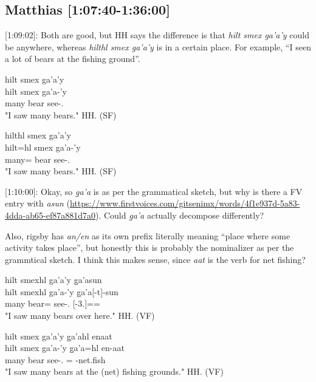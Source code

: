 \subsection{Matthias [1:07:40-1:36:00]}

[1:09:02]: Both are good, but HH says the difference is that \textit{hilt smex ga'a'y} could be anywhere, whereas \textit{hilthl smex ga'a'y} is in a certain place. For example, ``I seen a lot of bears at the fishing ground''.



\begin{exe}
    \ex
    \begin{xlist}
        \item \glll
        hilt smex ga'a'y \\
        hilt smex ga'a-'y \\
        many bear see-\Fsg{}.\Ii{} \\
        \glt "I saw many bears." \hfill HH.\ElicitationDate{} (SF)
        \item \glll
        hilthl smex ga'a'y \\
        hilt=hl smex ga'a-'y \\
        many=\Cn{} bear see-\Fsg{}.\Ii{} \\
        \glt "I saw many bears." \hfill HH.\ElicitationDate{} (SF)
    \end{xlist}
\end{exe}

[1:10:00]: Okay, so \textit{g̱a'a} is \Loc{} as per the grammatical sketch, but why is there a FV entry with \textit{asun} (\url{https://www.firstvoices.com/gitsenimx/words/4f1e937d-5a83-4dda-ab65-ef87a881d7a0}). Could \textit{g̱a'a} actually decompose differently?

Also, rigsby has \textit{an/en} as its own prefix literally meaning ``place where some activity takes place'', but honestly this is probably the nominalizer as per the grammtical sketch. I think this makes sense, since \textit{aat} is the verb for net fishing?

\begin{exe}
    \ex
    \begin{xlist}
        \item \glll
        hilt smexhl ga'a'y g̱a'asun \\
        hilt smexhl ga'a-'y g̱a'a[-t]-sun\\
        many bear=\Cn{} see-\Fsg{}.\Ii{} \Loc{}[-3.\Ii{}]=\Pn{}=\Demprox{}\\
        \glt "I saw many bears over here." \hfill HH.\ElicitationDate{} (VF)
        \item \glll
        hilt smex ga'a'y g̱a'ahl enaat \\
        hilt smex ga'a-'y g̱a'a=hl en-aat  \\
        many bear see-\Fsg{}.\Ii{} \Loc{}=\Cn{} \Nmlz{}-net.fish \\
        \glt "I saw many bears at the (net) fishing grounds." \hfill HH.\ElicitationDate{} (VF)
    \end{xlist}
\end{exe}

